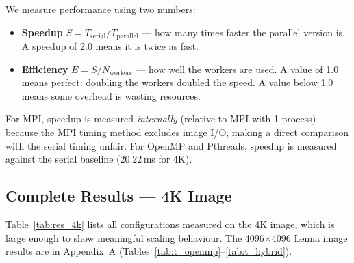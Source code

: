 \documentclass[12pt,a4paper]{article}
\begin{document}
We measure performance using two numbers:
\begin{itemize}
  \item \textbf{Speedup} $S = T_{\text{serial}} / T_{\text{parallel}}$ ---
        how many times faster the parallel version is. A speedup of 2.0
        means it is twice as fast.
  \item \textbf{Efficiency} $E = S / N_{\text{workers}}$ --- how well the
        workers are used. A value of 1.0 means perfect: doubling the workers
        doubled the speed. A value below 1.0 means some overhead is wasting
        resources.
\end{itemize}
For MPI, speedup is measured \emph{internally} (relative to MPI with 1 process)
because the MPI timing method excludes image I/O, making a direct comparison
with the serial timing unfair. For OpenMP and Pthreads, speedup is measured
against the serial baseline (20.22\,ms for 4K).

\subsection{Complete Results --- 4K Image}
\label{subsec:results_4k}

Table~\ref{tab:res_4k} lists all configurations measured on the 4K image,
which is large enough to show meaningful scaling behaviour. The 4096$\times$4096
Lenna image results are in Appendix~A (Tables~\ref{tab:t_openmp}--\ref{tab:t_hybrid}).
\end{document}
